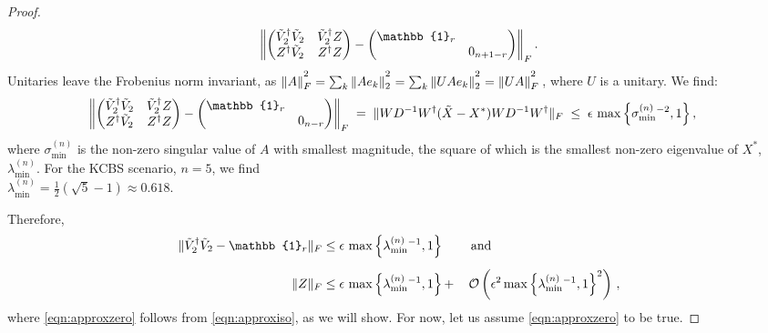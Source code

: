 \begin{proof}
\begin{equation*}
\left\|
\begin{pmatrix}
\Tilde{V}_2^{\dag}\Tilde{V}_2 & \Tilde{V}_2^{\dag} Z \\
Z^{\dag}\Tilde{V}_2 & Z^{\dag}Z
\end{pmatrix}
-
\begin{pmatrix}
\mathbb{1}_r & \\
& 0_{n+1-r}
\end{pmatrix}
\right\|_F.
\end{equation*}
Unitaries leave the Frobenius norm invariant, as $\|A\|_F^{\textstyle ^2}=\sum_k\|Ae_k\|_2^{\textstyle ^2} = \sum_k \|UAe_k\|_2^{\textstyle ^2}=\|UA\|_F^{\textstyle ^2}\thinspace$, where $U$ is a unitary. We find:
\begin{align*}
\left\|
\begin{pmatrix}
\Tilde{V}_2^{\dag}\Tilde{V}_2 & \Tilde{V}_2^{\dag} Z \\
Z^{\dag}\Tilde{V}_2 & Z^{\dag}Z
\end{pmatrix}
-
\begin{pmatrix}
\mathbb{1}_r & \\
& 0_{n-r}
\end{pmatrix}
\right\|_F\;=\;\|WD^{-1}W^{\dag}(\Tilde{X}-X^*)WD^{-1}W^{\dag}\|_F\; & \leq\; \epsilon\thinspace \operatorname{max}\left\{\sigma_{\text{min}}^{(n)}{}^{-2},1\right\},
\end{align*}
where $\sigma_{\text{min}}^{(n)}$ is the non-zero singular value of $A$ with smallest magnitude, the square of which is the smallest non-zero eigenvalue of $X^*$, $\lambda_{\text{min}}^{(n)}$.
For the KCBS scenario, $n=5$, we find \\$\lambda_{\text{min}}^{(n)}=\frac{1}{2}(\sqrt{5}-1)\approx 0.618$.

Therefore,
\begin{alignat}{2}
\label{eqn:approxiso}
\|\Tilde{V}_2^{\dag}\Tilde{V}_2-\mathbb{1}_r\|_F & \leq \epsilon\thinspace \operatorname{max}\left\{\lambda_{\text{min}}^{(n)}{}^{-1},1\right\} &&\text{ and}\\[0.5em]\label{eqn:approxzero}
\|Z\|_F & \leq \epsilon\thinspace\operatorname{max}\left\{\lambda_{\text{min}}^{(n)}{}^{-1},1\right\}+&&\thinspace\mathcal{O} \left(\epsilon^2\operatorname{max}\left\{\lambda_{\text{min}}^{(n)}{}^{-1},1\right\}^2\right)\thinspace,
\end{alignat}
where \ref{eqn:approxzero} follows from \ref{eqn:approxiso}, as we will show. For now, let us assume \ref{eqn:approxzero} to be true.


\end{proof}

